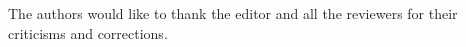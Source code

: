 \documentclass[extra]{gji}
\begin{document}
\begin{acknowledgments}
The authors would like to thank the editor and all the
reviewers for their criticisms and corrections.
\end{acknowledgments}





\appendix
%
%
%
%
\end{document}
